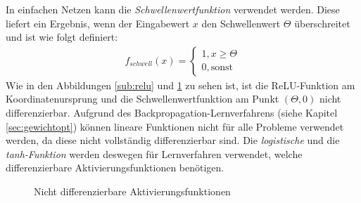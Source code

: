 \documentclass[12pt,a4paper,bibliography=totocnumbered,listof=totocnumbered]{article}
\begin{document}
In einfachen Netzen kann die \emph{Schwellenwertfunktion} verwendet werden. Diese liefert ein Ergebnis, wenn der Eingabewert $x$ den Schwellenwert $\Theta$ überschreitet und ist wie folgt definiert:
\begin{align}
f_{schwell}(x) = \begin{cases} 1, x \geq \Theta \\ 0, \text{sonst} \end{cases}
\end{align}
Wie in den Abbildungen \ref{sub:relu} und \ref{sub:schwell} zu sehen ist, ist die ReLU-Funktion am Koordinatenursprung und die Schwellenwertfunktion am Punkt $(\Theta ,0)$ nicht differenzierbar. Aufgrund des Backpropagation-Lernverfahrens (siehe Kapitel \ref{sec:gewichtopt}) können lineare Funktionen nicht für alle Probleme verwendet werden, da diese nicht vollständig differenzierbar sind. Die \emph{logistische} und die \emph{tanh-Funktion} werden deswegen für Lernverfahren verwendet, welche differenzierbare Aktivierungsfunktionen benötigen.
\begin{figure} [h]
\centering
\begin{minipage}[b]{0.45\textwidth}
\centering
{}
\label{sub:relu}
\end{minipage}
\qquad
\begin{minipage}[b]{0.45\textwidth}
\centering
{}
\label{sub:schwell}
\end{minipage}
\caption{Nicht differenzierbare Aktivierungsfunktionen}
\end{figure}
\end{document}

